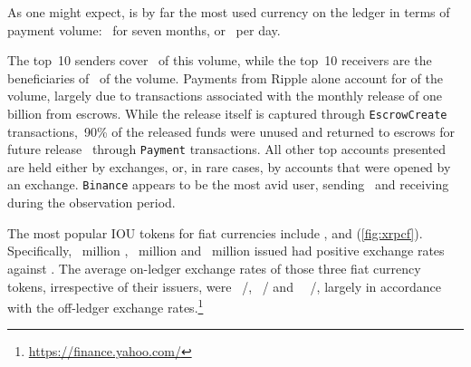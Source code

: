 As one might expect,  is by far the most used currency on the ledger in terms of payment volume:~  for seven months, or~  per day. 

The top~10 senders cover~ of this volume, while the top~10 receivers are the beneficiaries of~ of the volume. 
Payments from Ripple alone account for  of the  volume, largely due to transactions associated with the monthly release of one billion  from escrows. 
While the  release itself is captured through \texttt{EscrowCreate} transactions,~90\% of the released funds were unused and returned to escrows for future release~\cite{TeamRipple} through \texttt{Payment} transactions.
All other top accounts presented are held either by exchanges, or, in rare cases, by accounts that were opened by an exchange. 
\texttt{Binance} appears to be the most avid  user, sending~ and receiving~  during the observation period.

The most popular IOU tokens for fiat currencies include ,  and  (\autoref{fig:xrpcf}). 
Specifically,~ million ,~ million  and~ million  issued had positive exchange rates against . 
The average on-ledger exchange rates of those three fiat currency tokens, irrespective of their issuers, were~ /,~ / and~~ /, largely in accordance with the off-ledger exchange rates.\footnote{\url{https://finance.yahoo.com/}}




